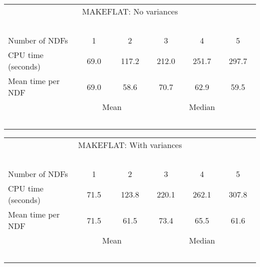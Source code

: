 \begin{center}
   \begin{tabular}{|l||c|c|c|c|c|}
   \multicolumn{6}{c}{MAKEFLAT: No variances} \\
   \multicolumn{6}{l}{~~~}
   \\ \hline
   Number of NDFs    & ~~~1~~~ & ~~~2~~~ & ~~~3~~~ & ~~~4~~~ & ~~~5~~~
    \\ \hline
   CPU time (seconds)&  69.0   & 117.2   & 212.0   &  251.7   & 297.7
    \\ \hline
   Mean time per NDF &  69.0   & 58.6    & 70.7    &  62.9    & 59.5
    \\ \hline
   \multicolumn{1}{c}{~~~}
   & \multicolumn{2}{c|}{Mean}
   & \multicolumn{3}{c}{Median}
   \\
   \multicolumn{6}{l}{~~~}
   \\
   \end{tabular}
   \begin{tabular}{|l||c|c|c|c|c|}
   \multicolumn{6}{c}{MAKEFLAT: With variances} \\
   \multicolumn{6}{l}{~~~}
   \\ \hline
   Number of NDFs    & ~~~1~~~ & ~~~2~~~ & ~~~3~~~ & ~~~4~~~ & ~~~5~~~
    \\ \hline
   CPU time (seconds)&  71.5   & 123.8   & 220.1   & 262.1   & 307.8
    \\ \hline
   Mean time per NDF &  71.5    & 61.5    & 73.4   &  65.5   & 61.6
    \\ \hline
   \multicolumn{1}{c}{~~~}
   & \multicolumn{2}{c|}{Mean}
   & \multicolumn{3}{c}{Median}
   \\
   \multicolumn{6}{l}{~~~}
   \\
   \end{tabular}
\end{center}

